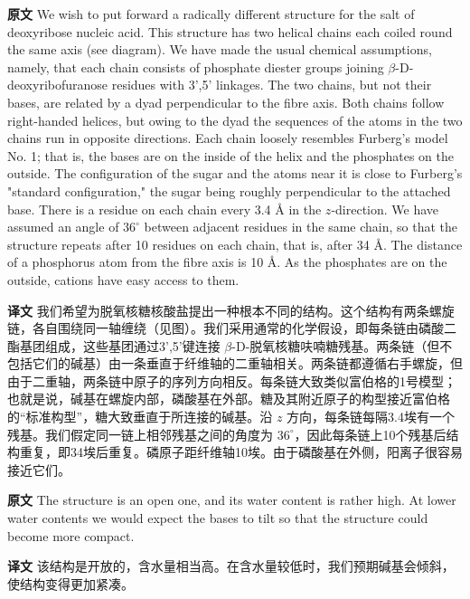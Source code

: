 \documentclass[UTF8,zihao=-4]{ctexart}
\newcommand{\BodyFont}{\fontsize{10.5pt}{15.5pt}\selectfont}
\renewenvironment{quote}{\par\noindent\begingroup\BodyFont}{\par\endgroup}
\begin{document}
\begin{quote}
\noindent\textbf{原文} We wish to put forward a radically different structure for the salt of deoxyribose nucleic acid. This structure has two helical chains each coiled round the same axis (see diagram). We have made the usual chemical assumptions, namely, that each chain consists of phosphate diester groups joining \(\beta\)-D-deoxyribofuranose residues with 3',5' linkages. The two chains, but not their bases, are related by a dyad perpendicular to the fibre axis. Both chains follow right-handed helices, but owing to the dyad the sequences of the atoms in the two chains run in opposite directions. Each chain loosely resembles Furberg's model No. 1; that is, the bases are on the inside of the helix and the phosphates on the outside. The configuration of the sugar and the atoms near it is close to Furberg's "standard configuration," the sugar being roughly perpendicular to the attached base. There is a residue on each chain every 3.4 \AA{} in the \(z\)-direction. We have assumed an angle of \(36^\circ\) between adjacent residues in the same chain, so that the structure repeats after 10 residues on each chain, that is, after 34 \AA{}. The distance of a phosphorus atom from the fibre axis is 10 \AA{}. As the phosphates are on the outside, cations have easy access to them.

\smallskip
\noindent\textbf{译文} 我们希望为脱氧核糖核酸盐提出一种根本不同的结构。这个结构有两条螺旋链，各自围绕同一轴缠绕（见图）。我们采用通常的化学假设，即每条链由磷酸二酯基团组成，这些基团通过3',5'键连接 \(\beta\)-D-脱氧核糖呋喃糖残基。两条链（但不包括它们的碱基）由一条垂直于纤维轴的二重轴相关。两条链都遵循右手螺旋，但由于二重轴，两条链中原子的序列方向相反。每条链大致类似富伯格的1号模型；也就是说，碱基在螺旋内部，磷酸基在外部。糖及其附近原子的构型接近富伯格的“标准构型”，糖大致垂直于所连接的碱基。沿 \(z\) 方向，每条链每隔3.4埃有一个残基。我们假定同一链上相邻残基之间的角度为 \(36^\circ\)，因此每条链上10个残基后结构重复，即34埃后重复。磷原子距纤维轴10埃。由于磷酸基在外侧，阳离子很容易接近它们。
\end{quote}

\begin{quote}
\noindent\textbf{原文} The structure is an open one, and its water content is rather high. At lower water contents we would expect the bases to tilt so that the structure could become more compact.

\smallskip
\noindent\textbf{译文} 该结构是开放的，含水量相当高。在含水量较低时，我们预期碱基会倾斜，使结构变得更加紧凑。
\end{quote}
\end{document}
